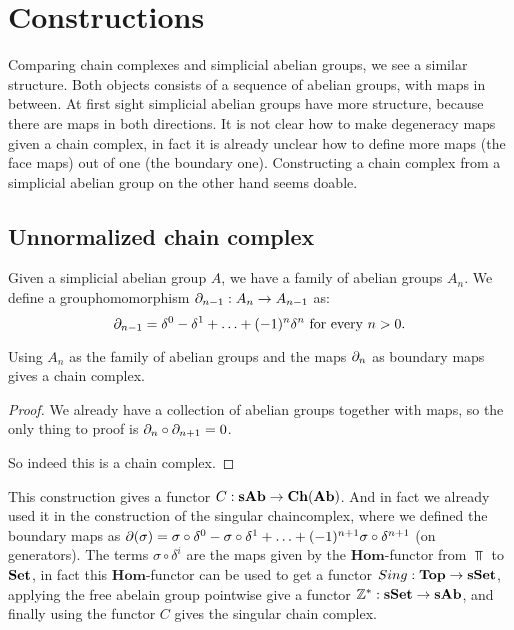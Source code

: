 \section{Constructions}
\label{sec:Constructions}

Comparing chain complexes and simplicial abelian groups, we see a similar structure. Both objects consists of a sequence of abelian groups, with maps in between. At first sight simplicial abelian groups have more structure, because there are maps in both directions. It is not clear how to make degeneracy maps given a chain complex, in fact it is already unclear how to define more maps (the face maps) out of one (the boundary one). Constructing a chain complex from a simplicial abelian group on the other hand seems doable.

\subsection{Unnormalized chain complex}
Given a simplicial abelian group $A$, we have a family of abelian groups $A_n$. We define a grouphomomorphism $\partial_{n-1} : A_n \to A_{n-1}$ as:
$$\partial_{n-1} = \delta^0 - \delta^1 + \ldots + (-1)^n \delta^n \text{ for every } n > 0.$$
\begin{lemma}
	Using $A_n$ as the family of abelian groups and the maps $\partial_n$ as boundary maps gives a chain complex.
\end{lemma}
\begin{proof}
	We already have a collection of abelian groups together with maps, so the only thing to proof is $\partial_n \circ \partial_{n+1} = 0$.


	So indeed this is a chain complex.
\end{proof}

This construction gives a functor $C : \mathbf{sAb} \to \mathbf{Ch}(\mathbf{Ab})$. And in fact we already used it in the construction of the singular chaincomplex, where we defined the boundary maps as $\partial(\sigma) = \sigma \circ \delta^0 - \sigma \circ \delta^1 + \ldots + (-1)^{n+1} \sigma \circ \delta^{n+1}$ (on generators). The terms $\sigma \circ \delta^i$ are the maps given by the $\mathbf{Hom}$-functor from $\Top$ to $\mathbf{Set}$, in fact this $\mathbf{Hom}$-functor can be used to get a functor $Sing : \mathbf{Top} \to \mathbf{sSet}$, applying the free abelain group pointwise give a functor $\mathbb{Z}^\ast : \mathbf{sSet} \to \mathbf{sAb}$, and finally using the functor $C$ gives the singular chain complex.

